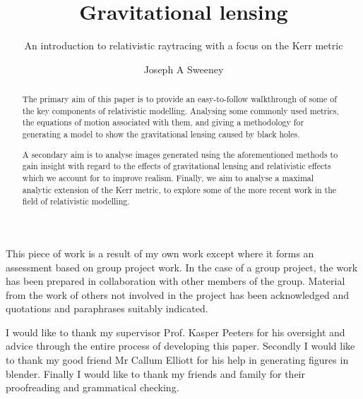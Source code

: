 \documentclass[oneside,openright,frontopenright, singlespacing]{dmathesis}
\begin{document}
\title{Gravitational lensing}
\subtitle{An introduction to relativistic raytracing with a focus on the Kerr metric}
\author{Joseph A Sweeney}
\maketitlepage*

\begin{abstract}
%
	The primary aim of this paper is to provide an easy-to-follow walkthrough of some of the key components of relativistic modelling. Analysing some commonly used metrics, the equations of motion associated with them, and giving a methodology for generating a model to show the gravitational lensing caused by black holes.

\vspace{1em}
	A secondary aim is to analyse images generated using the aforementioned methods to gain insight with regard to the effects of gravitational lensing and relativistic effects which we account for to improve realism. Finally, we aim to analyse a maximal analytic extension of the Kerr metric, to explore some of the more recent work in the field of relativistic modelling.
\end{abstract}

\begin{declaration*}
%
	This piece of work is a result of my own work except where it forms an assessment based on group project work. In the case of a group project, the work has been prepared in collaboration with other members of the group. Material from the work of others not involved in the project has been acknowledged and quotations and paraphrases suitably indicated.
%
\end{declaration*}

\begin{acknowledgements}
%
	I would like to thank my supervisor Prof. Kasper Peeters for his oversight and advice through the entire process of developing this paper. Secondly I would like to thank my good friend Mr Callum Elliott for his help in generating figures in blender. Finally I would like to thank my friends and family for their proofreading and grammatical checking.
%
\end{acknowledgements}

\disableprotrusion
\tableofcontents*
\enableprotrusion

\cleardoublepage
{}
\end{document}
